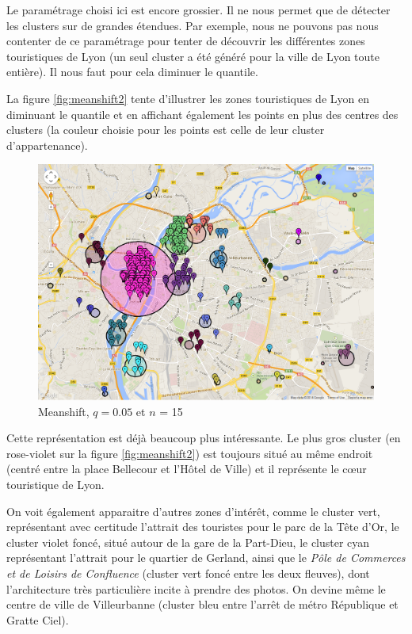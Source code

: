 Le paramétrage choisi ici est encore grossier. Il ne nous permet que de détecter les clusters sur de grandes étendues. Par exemple, nous ne pouvons pas nous contenter de ce paramétrage pour tenter de découvrir les différentes zones touristiques de Lyon (un seul cluster a été généré pour la ville de Lyon toute entière). Il nous faut pour cela diminuer le quantile.

La figure \vref{fig:meanshift2} tente d'illustrer les zones touristiques de Lyon en diminuant le quantile et en affichant également les points en plus des centres des clusters (la couleur choisie pour les points est celle de leur cluster d'appartenance).

\begin{figure}[!h]
    \centering
    \includegraphics[width=16cm]{images/meanshift2.png}
    \caption{Meanshift, $q = 0.05$ et $n$ = 15}
    \label{fig:meanshift2}
\end{figure}

Cette représentation est déjà beaucoup plus intéressante. Le plus gros cluster (en rose-violet sur la figure \vref{fig:meanshift2}) est toujours situé au même endroit (centré entre la place Bellecour et l'Hôtel de Ville) et il représente le cœur touristique de Lyon.

On voit également apparaitre d'autres zones d'intérêt, comme le cluster vert, représentant avec certitude l'attrait des touristes pour le parc de la Tête d'Or, le cluster violet foncé, situé autour de la gare de la Part-Dieu, le cluster cyan représentant l'attrait pour le quartier de Gerland, ainsi que le \textit{Pôle de Commerces et de Loisirs de Confluence} (cluster vert foncé entre les deux fleuves), dont l'architecture très particulière incite à prendre des photos. On devine même le centre de ville de Villeurbanne (cluster bleu entre l'arrêt de métro République et Gratte Ciel).

